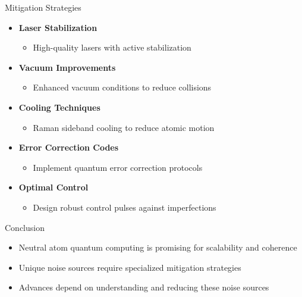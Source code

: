\documentclass{beamer}
\begin{document}
\begin{frame}{Mitigation Strategies}
    \begin{itemize}
        \item \textbf{Laser Stabilization}
        \begin{itemize}
            \item High-quality lasers with active stabilization
        \end{itemize}
        \item \textbf{Vacuum Improvements}
        \begin{itemize}
            \item Enhanced vacuum conditions to reduce collisions
        \end{itemize}
        \item \textbf{Cooling Techniques}
        \begin{itemize}
            \item Raman sideband cooling to reduce atomic motion
        \end{itemize}
        \item \textbf{Error Correction Codes}
        \begin{itemize}
            \item Implement quantum error correction protocols
        \end{itemize}
        \item \textbf{Optimal Control}
        \begin{itemize}
            \item Design robust control pulses against imperfections
        \end{itemize}
    \end{itemize}
\end{frame}

\begin{frame}{Conclusion}
    \begin{itemize}
        \item Neutral atom quantum computing is promising for scalability and coherence
        \item Unique noise sources require specialized mitigation strategies
        \item Advances depend on understanding and reducing these noise sources
    \end{itemize}
\end{frame}
\end{document}
